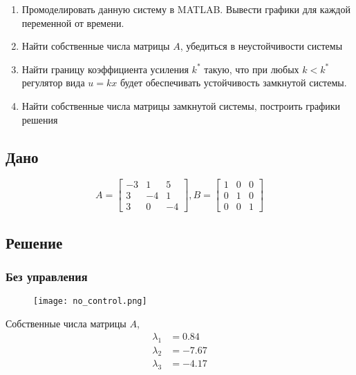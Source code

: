     \begin{enumerate}
        \item Промоделировать данную систему в MATLAB. Вывести графики для каждой переменной от времени.
        \item Найти собственные числа матрицы $A$, убедиться в неустойчивости системы
        \item Найти границу коэффициента усиления $k^*$ такую, что при любых $k < k^*$ регулятор вида $u = kx$ будет
        обеспечивать устойчивость замкнутой системы.
        \item Найти собственные числа матрицы замкнутой системы, построить графики решения
    \end{enumerate}

    \subsection*{Дано}
    \begin{equation*}
        A =
        \begin{bmatrix}
            -3&  1&  5\\
            3& -4&  1\\
            3&  0& -4
        \end{bmatrix}
        , B =
        \begin{bmatrix}
            1& 0& 0\\
            0& 1& 0\\
            0& 0& 1
        \end{bmatrix}
    \end{equation*}

    \subsection*{Решение}
    \subsubsection*{Без управления}
    \begin{figure}[H]
        \centering
        \texttt{[image: no\_control.png]}
    \end{figure}
    Собственные числа матрицы $A$,
    \begin{equation*}
        \begin{aligned}
            \lambda_1 &= 0.84 \\
            \lambda_2 &= -7.67\\
            \lambda_3 &= -4.17
        \end{aligned}
    \end{equation*}

